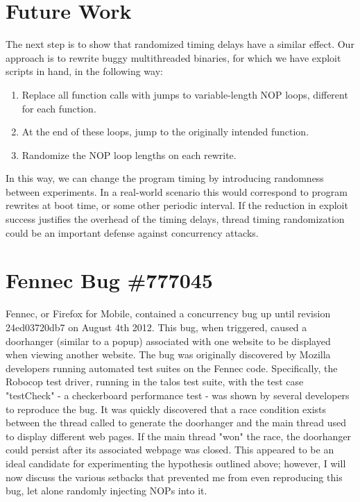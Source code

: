 \documentclass[12pt,conference]{IEEEtran}
\begin{document}
\section{Future Work}
The next step is to show that randomized timing delays have a similar effect.  Our approach is to rewrite buggy multithreaded binaries, for which we have exploit scripts in hand, in the following way:
\begin{enumerate}
	\item Replace all function calls with jumps to variable-length NOP loops, different for each function.
	\item At the end of these loops, jump to the originally intended function.
	\item Randomize the NOP loop lengths on each rewrite.
\end{enumerate}
In this way, we can change the program timing by introducing randomness between experiments.  In a real-world scenario this would correspond to program rewrites at boot time, or some other periodic interval.  If the reduction in exploit success justifies the overhead of the timing delays, thread timing randomization could be an important defense against concurrency attacks.

\section{Fennec Bug \#777045}
Fennec, or Firefox for Mobile, contained a concurrency bug up until revision 24ed03720db7 on August 4th 2012.  This bug, when triggered, caused a doorhanger (similar to a popup) associated with one website to be displayed when viewing another website.  The bug was originally discovered by Mozilla developers running automated test suites on the Fennec code.  Specifically, the Robocop test driver, running in the talos test suite, with the test case "testCheck" - a checkerboard performance test - was shown by several developers to reproduce the bug.  It was quickly discovered that a race condition exists between the thread called to generate the doorhanger and the main thread used to display different web pages.  If the main thread "won" the race, the doorhanger could persist after its associated webpage was closed.  This appeared to be an ideal candidate for experimenting the hypothesis outlined above; however, I will now discuss the various setbacks that prevented me from even reproducing this bug, let alone randomly injecting NOPs into it.
\end{document}
